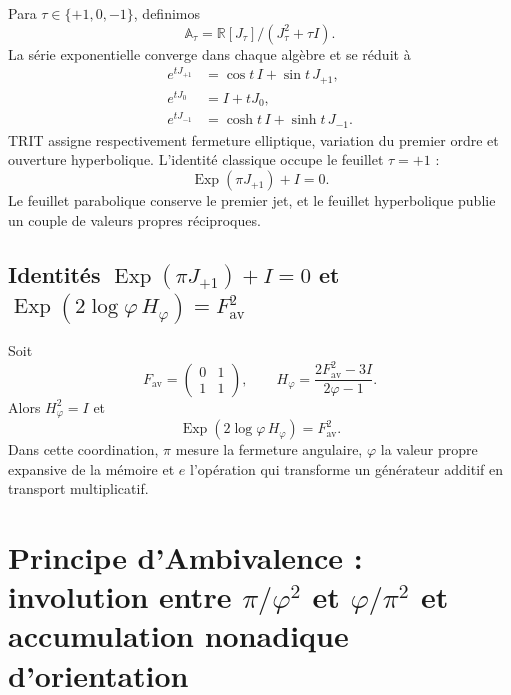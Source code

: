 Para \(\tau\in\{+1,0,-1\}\), definimos
\begin{equation}
 \mathbb A_\tau
 =\mathbb R[J_\tau]/(J_\tau^2+\tau I).
 \label{eq:l9s102:euler-algebras}
\end{equation}
La série exponentielle converge dans chaque algèbre et se réduit à
\begin{align}
 e^{tJ_{+1}}&=\cos t\,I+\sin t\,J_{+1},
 \label{eq:l9s102:euler-eliptica}\\
 e^{tJ_0}&=I+tJ_0,
 \label{eq:l9s102:euler-parabolica}\\
 e^{tJ_{-1}}&=\cosh t\,I+\sinh t\,J_{-1}.
 \label{eq:l9s102:euler-hiperbolica}
\end{align}
TRIT assigne respectivement fermeture elliptique, variation du premier ordre et
ouverture hyperbolique. L'identité classique occupe le feuillet \(\tau=+1\) :
\begin{equation}
 \boxed{\operatorname{Exp}(\pi J_{+1})+I=0.}
 \label{eq:l9s102:euler-clasica}
\end{equation}
Le feuillet parabolique conserve le premier jet, et le feuillet hyperbolique publie
un couple de valeurs propres réciproques.

\subsection{Identités \texorpdfstring{\(\operatorname{Exp}(\pi J_{+1})+I=0\)}{Exp(pi J+1)+I=0} et \texorpdfstring{\(\operatorname{Exp}(2\log\varphi\,H_\varphi)=F_{\mathrm{av}}^2\)}{Exp(2 log phi H_phi)=F_av^2}}

Soit
\begin{equation}
 F_{\mathrm{av}}=\begin{pmatrix}0&1\\1&1\end{pmatrix},
 \qquad
 H_\varphi=\frac{2F_{\mathrm{av}}^2-3I}{2\varphi-1}.
 \label{eq:l9s102:euler-hphi}
\end{equation}
Alors \(H_\varphi^2=I\) et
\begin{equation}
 \boxed{
 \operatorname{Exp}(2\log\varphi\,H_\varphi)=F_{\mathrm{av}}^2.}
 \label{eq:l9s102:euler-fav}
\end{equation}
Dans cette coordination, \(\pi\) mesure la fermeture angulaire, \(\varphi\) la
valeur propre expansive de la mémoire et \(e\) l'opération qui transforme un
générateur additif en transport multiplicatif.

\section{Principe d'Ambivalence : involution entre \texorpdfstring{\(\pi/\varphi^2\)}{pi/phi^2} et \texorpdfstring{\(\varphi/\pi^2\)}{phi/pi^2} et accumulation nonadique d'orientation}
\label{sec:l9s102:euler-ambivalencia}


